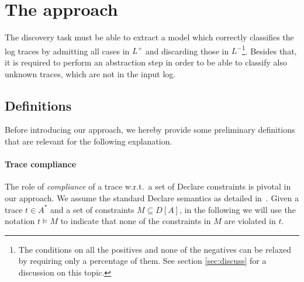 
\section{The approach}
\label{sec:approach}

The discovery task must be able to extract a model which correctly classifies the log traces by admitting all cases in $L^+$ and discarding those in $L^-$\footnote{The conditions on all the positives and none of the negatives can be relaxed by requiring only a percentage of them. See section \ref{sec:discuss} for a discussion on this topic.}. Besides that, it is required to perform an abstraction step in order to be able to classify also unknown traces, which are not in the input log. %

\subsection{Definitions}
Before introducing our approach, we hereby provide some preliminary definitions that are relevant for the following explanation.



\paragraph{Trace compliance} The role of \emph{compliance} of a trace w.r.t.\ a set of Declare constraints is pivotal in our approach. We assume the standard Declare semantics as detailed in~\cite{2008-Pesic}. 
Given a trace $t\in A^*$ and a set of constraints $M\subseteq D[A]$, in the following we will use the notation $t\models M$ to indicate that none of the constraints in $M$ are violated in $t$.


